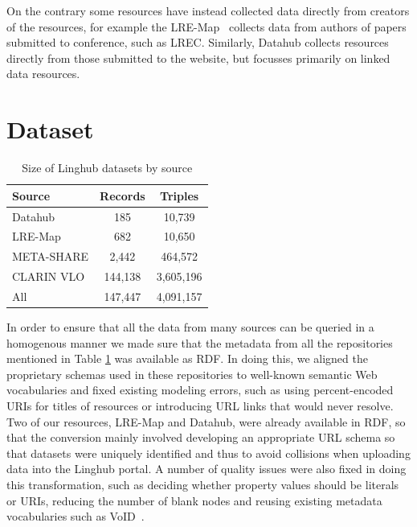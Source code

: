 \documentclass{acm_proc_article-sp}
\begin{document}
On the contrary some resources have instead collected data directly from
creators of the resources, for example the LRE-Map~\cite{calzolari2012lre} collects data from
authors of papers submitted to conference, such as LREC. Similarly,
Datahub collects resources directly from
those submitted to the website, but focusses primarily on linked data resources.

\section{Dataset}
\label{sec:dataset}

\begin{table}
	\centering
	\begin{tabular}{p{30mm}|cc}
	Source               & Records    & Triples  \\
	\hline
	Datahub              & 185        & 10,739   \\
	LRE-Map              & 682        & 10,650   \\
	META-SHARE           & 2,442      & 464,572  \\
	CLARIN VLO           & 144,138    & 3,605,196\\
	\hline
	All                  & 147,447    & 4,091,157\\
	\end{tabular}
	\caption{Size of Linghub datasets by source\label{tab:size}}
\end{table}

In order to ensure that all the data from many sources can be queried in a
homogenous manner we made sure that the metadata from all the repositories mentioned in Table \ref{tab:size} was available as RDF.
In doing this, we aligned the proprietary schemas used in these repositories to
well-known semantic Web vocabularies and fixed existing modeling errors, such as
using percent-encoded URIs for titles of resources or introducing URL links that
would never resolve.
Two of our resources, LRE-Map and Datahub, were already available in RDF, so that the conversion
mainly involved developing an appropriate URL schema so that datasets were
uniquely identified and thus to avoid collisions when uploading data into the
Linghub portal. A number of quality issues were also fixed in doing this
transformation, such as deciding whether property values should be literals or
URIs, reducing the number of blank nodes and reusing existing metadata
vocabularies such as VoID~\cite{alexander2011describing}.
\end{document}
